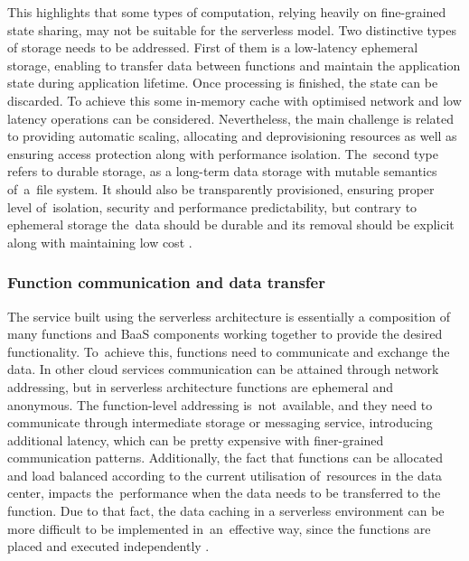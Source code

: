 This highlights that some types of computation, relying heavily on fine-grained state sharing, may not be suitable for the serverless model. Two distinctive types of storage needs to be addressed. First of them is a low-latency ephemeral storage, enabling to transfer data between functions and maintain the application state during application lifetime. Once processing is finished, the state can be discarded. To achieve this some in-memory cache with optimised network and low latency operations can be considered. Nevertheless, the main challenge is related to providing automatic scaling, allocating and deprovisioning resources as well as ensuring access protection along with performance isolation. The~second type refers to durable storage, as a long-term data storage with mutable semantics of~a~file system. It should also be transparently provisioned, ensuring proper level of~isolation, security and performance predictability, but contrary to ephemeral storage the~data should be durable and its removal should be explicit along with maintaining low cost \cite{BerkeleyServerless}.

\subsubsection{Function communication and data transfer}

The service built using the serverless architecture is essentially a composition of many functions and BaaS components working together to provide the desired functionality. To~achieve this, functions need to communicate and exchange the data. In other cloud services communication can be attained through network addressing, but in serverless architecture functions are ephemeral and anonymous. The function-level addressing is~not~available, and they need to communicate through intermediate storage or messaging service, introducing additional latency, which can be pretty expensive with finer-grained communication patterns. Additionally, the fact that functions can be allocated and load balanced according to the current utilisation of~resources in the data center, impacts the~performance when the data needs to be transferred to the function. Due to that fact, the data caching in a serverless environment can be more difficult to be implemented in~an~effective way, since the functions are placed and executed independently \cite{ServerlessComputingSurveyOfOpportunitiesChallengesApplications}.

